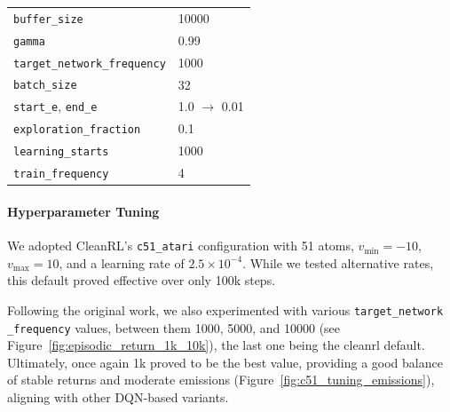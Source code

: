 \begin{table}
\begin{tabular}{ll}
		\texttt{buffer\_size}             & 10000 \\
		\texttt{gamma}                    & 0.99 \\
		\texttt{target\_network\_frequency} & 1000 \\
		\texttt{batch\_size}             & 32 \\
		\texttt{start\_e}, \texttt{end\_e} & 1.0 $\to$ 0.01 \\
		\texttt{exploration\_fraction}    & 0.1 \\
		\texttt{learning\_starts}         & 1000 \\
		\texttt{train\_frequency}         & 4 \\
		\bottomrule
	\end{tabular}
\end{table}

\paragraph{Hyperparameter Tuning}
We adopted CleanRL's \texttt{c51\_atari} configuration with 51 atoms, $v_{\min}=-10$, $v_{\max}=10$, 
and a learning rate of $2.5\times10^{-4}$. While we tested alternative rates, 
this default proved effective over only 100k steps.  

Following the original work, we also experimented with various \texttt{target\_network\\\_frequency} values, between them \num{1000}, \num{5000}, and \num{10000} (see Figure~\ref{fig:episodic_return_1k_10k}), the last one being the cleanrl default. Ultimately, once again 1k proved to be the best value, providing a good balance of stable returns and moderate emissions (Figure~\ref{fig:c51_tuning_emissions}), aligning with other DQN-based variants.

